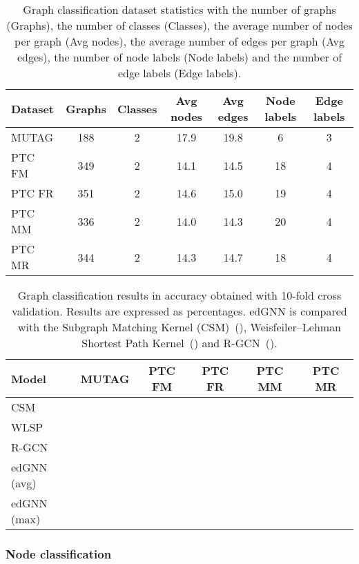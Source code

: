 \documentclass{article} \usepackage{iclr2019_conference,times}
\begin{document}
\begin{table}[h]
  \caption{Graph classification dataset statistics with the number of graphs (Graphs), the number of classes (Classes), the average number of nodes per graph (Avg nodes), the average number of edges per graph (Avg edges), the number of node labels (Node labels) and the number of edge labels (Edge labels).}
  \label{tab:graph_class_stat}
  \centering
  \begin{tabular}{lcccccc}
  \toprule
    Dataset & Graphs & Classes & Avg nodes & Avg edges & Node labels & Edge labels   \\
    \midrule
    MUTAG  &   188  & 2 & 17.9 & 19.8  & 6 & 3   \\
    PTC FM &   349  & 2 & 14.1 & 14.5 & 18 & 4  \\
    PTC FR &   351  & 2 & 14.6 & 15.0 & 19 & 4  \\
    PTC MM &   336  & 2 & 14.0 & 14.3 & 20 & 4  \\
    PTC MR &   344  & 2 & 14.3 & 14.7 & 18 & 4  \\
    \bottomrule
  \end{tabular}
\end{table}

\begin{table}[h]
  \caption{Graph classification results in accuracy obtained with 10-fold cross validation. Results are expressed as percentages. edGNN is compared with the Subgraph Matching Kernel (CSM)~(\cite{Kriege2012}), Weisfeiler--Lehman Shortest Path Kernel~(\cite{Shervashidze2011}) and R-GCN~(\cite{Schlichtkrull2018}).}
  \label{tab:graph_class}
  \centering
  \begin{tabular}{lccccc}
  \toprule
    Model & MUTAG & PTC FM & PTC FR & PTC MM & PTC MR \\
    \midrule
    CSM &   &  &   &  &  \\
    WLSP &  &  &  &  &  \\
    R-GCN &   &   &  &   &  \\
    \midrule
    edGNN (avg) &  &           &  &           &  \\
    edGNN (max) &           &           &           &           &  \\
    
    \bottomrule
  \end{tabular}
\end{table}


\subsubsection{Node classification}
\end{document}
